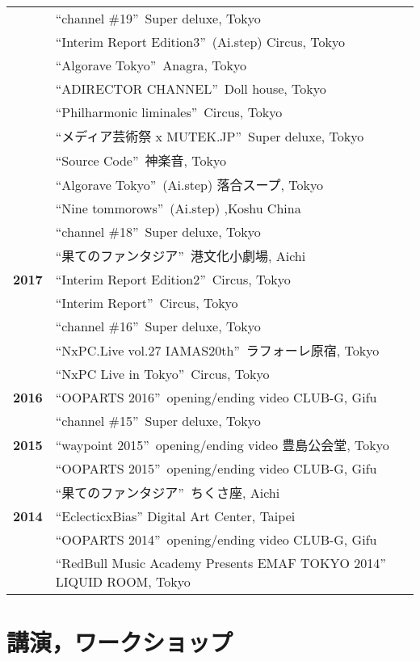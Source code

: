 \documentclass[8pt,a4paper]{article}
\begin{document}
\begin{longtable}{@{}p{1.2cm}@{\hspace{0.5cm}}p{14cm}@{}}
& ``channel \#19''\, Super deluxe, Tokyo \\
& ``Interim Report Edition3''\, (Ai.step) Circus, Tokyo \\
& ``Algorave Tokyo''\, Anagra, Tokyo \\
& ``ADIRECTOR CHANNEL''\, Doll house, Tokyo \\
& ``Philharmonic liminales''\, Circus, Tokyo \\
& ``メディア芸術祭 x MUTEK.JP''\, Super deluxe, Tokyo \\
& ``Source Code''\, 神楽音, Tokyo \\
& ``Algorave Tokyo''\, (Ai.step) 落合スープ, Tokyo \\
& ``Nine tommorows''\, (Ai.step) ,Koshu China \\
& ``channel \#18''\, Super deluxe, Tokyo \\
& ``果てのファンタジア''\, 港文化小劇場, Aichi \\[0.2em]
\textbf{2017} & ``Interim Report Edition2''\, Circus, Tokyo \\
& ``Interim Report''\, Circus, Tokyo \\
& ``channel \#16''\, Super deluxe, Tokyo \\
& ``NxPC.Live vol.27 IAMAS20th''\, ラフォーレ原宿, Tokyo \\
& ``NxPC Live in Tokyo''\, Circus, Tokyo \\[0.2em]
\textbf{2016} & ``OOPARTS 2016''\, opening/ending video CLUB-G, Gifu \\
& ``channel \#15''\, Super deluxe, Tokyo \\[0.2em]
\textbf{2015} & ``waypoint 2015''\, opening/ending video 豊島公会堂, Tokyo \\
& ``OOPARTS 2015''\, opening/ending video CLUB-G, Gifu \\
& ``果てのファンタジア''\, ちくさ座, Aichi \\[0.2em]
\textbf{2014} & ``EclecticxBias'' Digital Art Center, Taipei \\
& ``OOPARTS 2014''\, opening/ending video CLUB-G, Gifu \\
& ``RedBull Music Academy Presents EMAF TOKYO 2014'' LIQUID ROOM, Tokyo \\
\end{longtable}

\section*{講演，ワークショップ}
\end{document}
